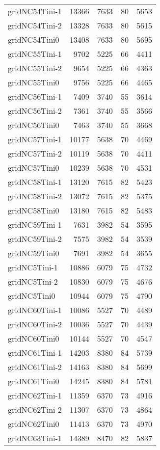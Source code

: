 \begin{longtable}{lrrrr}
gridNC54Tini-1 & 13366 & 7633 & 80 & 5653 \\
gridNC54Tini-2 & 13328 & 7633 & 80 & 5615 \\
gridNC54Tini0 & 13408 & 7633 & 80 & 5695 \\
gridNC55Tini-1 & 9702 & 5225 & 66 & 4411 \\
gridNC55Tini-2 & 9654 & 5225 & 66 & 4363 \\
gridNC55Tini0 & 9756 & 5225 & 66 & 4465 \\
gridNC56Tini-1 & 7409 & 3740 & 55 & 3614 \\
gridNC56Tini-2 & 7361 & 3740 & 55 & 3566 \\
gridNC56Tini0 & 7463 & 3740 & 55 & 3668 \\
gridNC57Tini-1 & 10177 & 5638 & 70 & 4469 \\
gridNC57Tini-2 & 10119 & 5638 & 70 & 4411 \\
gridNC57Tini0 & 10239 & 5638 & 70 & 4531 \\
gridNC58Tini-1 & 13120 & 7615 & 82 & 5423 \\
gridNC58Tini-2 & 13072 & 7615 & 82 & 5375 \\
gridNC58Tini0 & 13180 & 7615 & 82 & 5483 \\
gridNC59Tini-1 & 7631 & 3982 & 54 & 3595 \\
gridNC59Tini-2 & 7575 & 3982 & 54 & 3539 \\
gridNC59Tini0 & 7691 & 3982 & 54 & 3655 \\
gridNC5Tini-1 & 10886 & 6079 & 75 & 4732 \\
gridNC5Tini-2 & 10830 & 6079 & 75 & 4676 \\
gridNC5Tini0 & 10944 & 6079 & 75 & 4790 \\
gridNC60Tini-1 & 10086 & 5527 & 70 & 4489 \\
gridNC60Tini-2 & 10036 & 5527 & 70 & 4439 \\
gridNC60Tini0 & 10144 & 5527 & 70 & 4547 \\
gridNC61Tini-1 & 14203 & 8380 & 84 & 5739 \\
gridNC61Tini-2 & 14163 & 8380 & 84 & 5699 \\
gridNC61Tini0 & 14245 & 8380 & 84 & 5781 \\
gridNC62Tini-1 & 11359 & 6370 & 73 & 4916 \\
gridNC62Tini-2 & 11307 & 6370 & 73 & 4864 \\
gridNC62Tini0 & 11413 & 6370 & 73 & 4970 \\
gridNC63Tini-1 & 14389 & 8470 & 82 & 5837 \\

\end{longtable}
